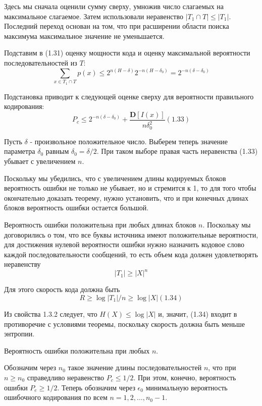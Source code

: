 \documentclass[14pt]{article}
\begin{document}
Здесь мы сначала оценили сумму сверху, умножив число слагаемых на максимальное слагаемое. Затем использовали неравенство \(|T_1 \cap T| \leq |T_1|\). Последний переход основан на том, что при расширении области поиска максимума максимальное значение не уменьшается.

Подставим в (1.31) оценку мощности кода и оценку максимальной вероятности последовательностей из \(T\):
\begin{displaymath}
    \sum_{x \in T_1 \cap T} p(x) \leq 2^{n(H-\delta)}2^{-n(H-\delta_0)} = 2^{-n(\delta-\delta_0)}
\end{displaymath}

Подстановка приводит к следующей оценке сверху для вероятности правильного кодирования:
\begin{displaymath}
    P_c \leq 2^{-n(\delta-\delta_0)} + \frac{\textbf{D}[I(x)]}{n\delta_0^2}   (1.33)
\end{displaymath}

Пусть \(\delta\) - произвольное положительное число. Выберем теперь значение параметра \(\delta_0\) равным \(\delta_0 = \delta / 2\). При таком выборе правая часть неравенства (1.33) убывает с увеличением \(n\).

Поскольку мы убедились, что с увеличением длины кодируемых блоков вероятность ошибки не только не убывает, но и стремится к 1, то для того чтобы окончательно доказать теорему, нужно установить, что и при конечных длинах блоков вероятность ошибки остается
большой.

Вероятность ошибки положительна при любых длинах блоков \(n\). Поскольку мы договорились о том, что все буквы источника имеют положительные вероятности, для достижения нулевой вероятности ошибки нужно назначить кодовое слово каждой последовательности сообщений, то есть объем кода должен удовлетворять неравенству
\begin{displaymath}
    |T_1| \geq |X|^n
\end{displaymath}

Для этого скорость кода должна быть
\begin{displaymath}
    R \geq \log |T_1|/n \geq \log |X|    (1.34)
\end{displaymath}

Из свойства 1.3.2 следует, что \(H(X) \leq \log |X|\) и, значит, (1.34) входит в противоречие с условиями теоремы, поскольку скорость должна быть меньше энтропии.

Вероятность ошибки положительна при любых \(n\).

Обозначим через \(n_0\) такое значение длины последовательностей \(n\), что при \(n \geq n_0\) справедливо неравенство \(P_c \leq 1/2\). При этом, конечно, вероятность ошибки \(P_e \geq 1/2\). Теперь обозначим через \( \epsilon_0\) минимальную вероятность ошибочного кодирования по всем \(n = 1,2,\ldots,n_0 - 1\).
\end{document}
